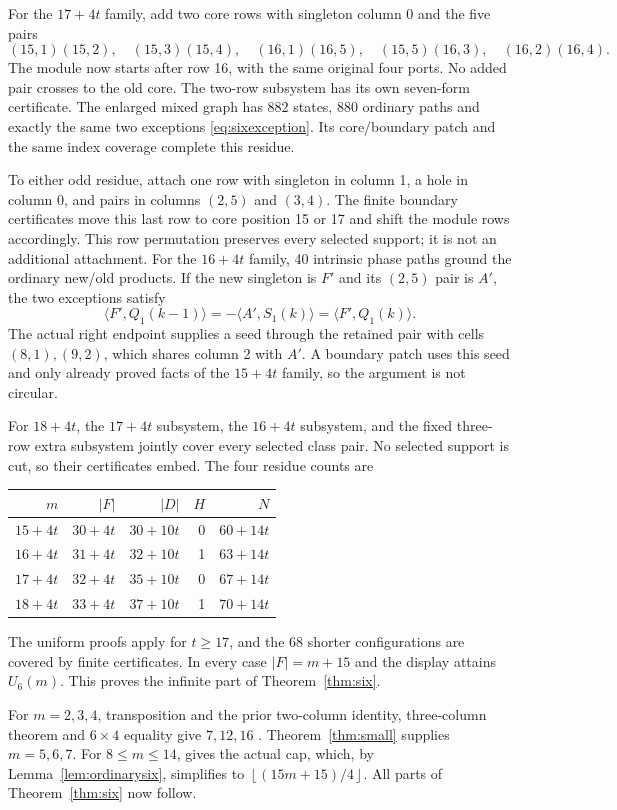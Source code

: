 \documentclass[11pt,a4paper]{article}
\theoremstyle{definition}
\newcommand{\fl}[1]{\left\lfloor #1\right\rfloor}
\begin{document}
For the $17+4t$ family, add two core rows with singleton column 0 and
the five pairs
\[
 (15,1)(15,2),\quad(15,3)(15,4),\quad(16,1)(16,5),\quad
 (15,5)(16,3),\quad(16,2)(16,4).
\]
The module now starts after row 16, with the same original four ports.
No added pair crosses to the old core. The two-row subsystem has its
own seven-form certificate. The enlarged mixed graph has 882 states,
880 ordinary paths and exactly the same two exceptions
\eqref{eq:sixexception}. Its core/boundary patch and the same index
coverage complete this residue.

To either odd residue, attach one row with singleton in column 1, a
hole in column 0, and pairs in columns $(2,5)$ and $(3,4)$.
The finite boundary certificates move this last row to core position
15 or 17 and shift the module rows accordingly. This row permutation
preserves every selected support; it is not an additional attachment.
For the $16+4t$ family, 40 intrinsic phase paths ground the ordinary
new/old products. If the new singleton is $F'$ and its $(2,5)$ pair
is $A'$, the two exceptions satisfy
\[
 \langle F',Q_1(k-1)\rangle
   =-\langle A',S_1(k)\rangle
   =\langle F',Q_1(k)\rangle.
\]
The actual right endpoint supplies a seed through the retained pair
with cells $(8,1),(9,2)$, which shares column 2 with $A'$.
A boundary patch uses this seed and only already proved facts of the
$15+4t$ family, so the argument is not circular.

For $18+4t$, the $17+4t$ subsystem, the $16+4t$ subsystem, and the fixed
three-row extra subsystem jointly cover every selected class pair.
No selected support is cut, so their certificates embed. The four
residue counts are
\begin{center}
\begin{tabular}{rrrrr}
\toprule
$m$&$|F|$&$|D|$&$H$&$N$\\
\midrule
$15+4t$&$30+4t$&$30+10t$&0&$60+14t$\\
$16+4t$&$31+4t$&$32+10t$&1&$63+14t$\\
$17+4t$&$32+4t$&$35+10t$&0&$67+14t$\\
$18+4t$&$33+4t$&$37+10t$&1&$70+14t$\\
\bottomrule
\end{tabular}
\end{center}
The uniform proofs apply for $t\ge17$, and the 68 shorter configurations
are covered by finite certificates. In every case $|F|=m+15$ and the
display attains $U_6(m)$. This proves the infinite part of
Theorem~\ref{thm:six}.

For $m=2,3,4$, transposition and the prior two-column identity,
three-column theorem and $6\times4$ equality give $7,12,16$
\cite{LQ}. Theorem~\ref{thm:small} supplies $m=5,6,7$.
For $8\le m\le14$, \cite[Corollary~4.2]{CCQ} gives the actual cap,
which, by Lemma~\ref{lem:ordinarysix}, simplifies to
$\fl{(15m+15)/4}$. All parts of
Theorem~\ref{thm:six} now follow.
\end{document}
